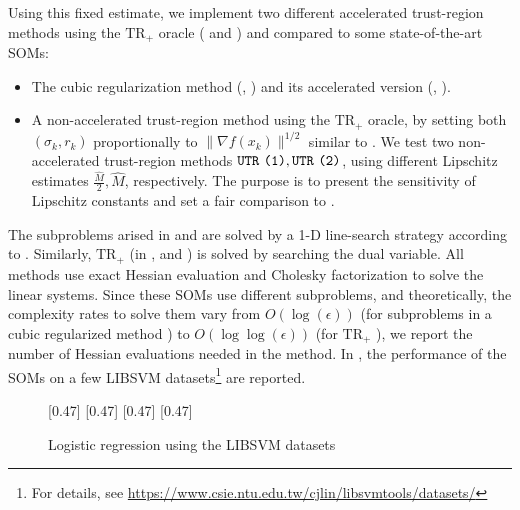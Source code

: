 \documentclass{mcom-l}
\newcommand{\trp}{\textrm{TR}_+}
\numberwithin{equation}{section}
\begin{document}
Using this fixed estimate, we implement two different accelerated trust-region methods using the $\trp{}$ oracle (\atr{} and \atrms{}) and compared to some state-of-the-art SOMs:
\begin{itemize}[leftmargin=*]
    \item The cubic regularization method (\arc{}, \citet{nesterov2006cubic}) and its accelerated version (\arca{}, \citet{nesterov2008accelerating}).
    \item A non-accelerated trust-region method using the $\trp{}$ oracle, by setting both $(\sigma_k, r_k)$ proportionally to $\|\nabla f(x_k)\|^{1/2}$ similar to \cite{jiang2024nonconvexityuniversaltrustregionmethod}.
          We test two non-accelerated trust-region methods $\texttt{UTR}{}~\texttt{(1)}, \texttt{UTR}{}~\texttt{(2)}$, using different Lipschitz estimates $\tfrac{\widehat M}{2}, \widehat M$, respectively. The purpose is to present the sensitivity of Lipschitz constants and set a fair comparison to \arc{}.
\end{itemize}
The subproblems arised in \arc{} and \arca{} are solved by a 1-D line-search strategy according to \cite{nesterov_lectures_2018}. Similarly, $\trp{}$ (in \utr{}, \atr{} and \atrms{}) is solved by searching the dual variable. All methods use exact Hessian evaluation and Cholesky factorization to solve the linear systems.
Since these SOMs use different subproblems, and theoretically, the complexity rates to solve them vary from $O(\log(\epsilon))$ (for subproblems in a cubic regularized method \cite{nesterov2006cubic}) to $O(\log\log(\epsilon))$ (for $\trp{}$ \cite{yenewcomplexityresult1991,vavasisProvingPolynomialtimeSphereconstrained1990}),
we report the number of Hessian evaluations needed in the method.  In , the performance of the SOMs on a few LIBSVM datasets\footnote{For details, see \url{https://www.csie.ntu.edu.tw/cjlin/libsvmtools/datasets/}} are reported.
\begin{figure}[h]
    \small
    \centering
    [0.47\columnwidth]{
        \resizebox{0.47\columnwidth}{!}{}
    }
    [0.47\columnwidth]{
        \resizebox{0.47\columnwidth}{!}{}
    }
    [0.47\columnwidth]{
        \resizebox{0.47\columnwidth}{!}{}
    }
    [0.47\columnwidth]{
        \resizebox{0.47\columnwidth}{!}{}
    }

    \caption{Logistic regression using the LIBSVM datasets}\label{fig.logistic regression}
    \normalsize
\end{figure}
\end{document}
